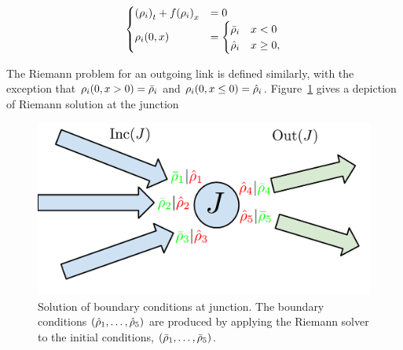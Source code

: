 \begin{equation}
	\begin{cases}
		\left(\cvar_{\link}\right)_{t}+f\left(\cvar_{\link}\right)_{x} & =0             \\
		\cvar_{\link}\left(0,x\right)                                  & =\begin{cases} 
		\initstate_{\link}                                             & x<0            \\
		\trace{\cvar}_{\link}                                          & x\ge0,         
	\end{cases}
	\end{cases}\label{eq:riemann-problem}
\end{equation}

The Riemann problem for an outgoing link is defined similarly, with
the exception that $\cvar_{\link}\left(0,x>0\right)=\initstate_{\link}$
and $\cvar_{\link}\left(0,x\le0\right)=\trace{\cvar}_{\link}$. Figure~\ref{fig:Solution-of-boundary}
gives a depiction of Riemann solution at the junction%
\begin{figure}
	\begin{centering}
		\includegraphics[width=0.5\columnwidth]{presentation/figs-gen/junctions-riemann-rs} 
		\par\end{centering}
				
		\caption{Solution of boundary conditions at junction. The boundary conditions
			$\tuple{\trace{\cvar}_{1}}{\trace{\cvar}_{5}}$ are produced by applying
			the Riemann solver to the initial conditions, $\tuple{\initstate_{1}}{\initstate_{5}}$.\label{fig:Solution-of-boundary}}
		\end{figure}
				

